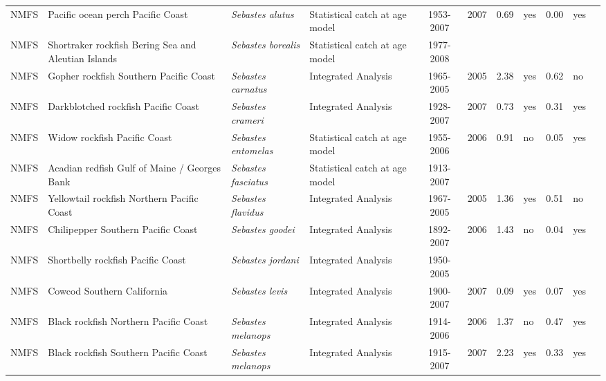 \begin{longtable}{p{1.8cm}p{3.5cm}p{3.5cm}p{3cm}cccp{0.9cm}cp{0.9cm}c}
  NMFS & Pacific ocean perch Pacific Coast & \textit{Sebastes alutus} & Statistical catch at age model & 1953-2007 & 2007 & 0.69 & yes & 0.00 & yes & \cite{NWFSC-POPERCHPCOAST-2007-Pacific ocean perch.pdf} \\ 
  NMFS & Shortraker rockfish Bering Sea and Aleutian Islands & \textit{Sebastes borealis} & Statistical catch at age model & 1977-2008 &  &  &  &  &  & \cite{2008_SAFE_BSAIshortraker.pdf} \\ 
  NMFS & Gopher rockfish Southern Pacific Coast & \textit{Sebastes carnatus} & Integrated Analysis & 1965-2005 & 2005 & 2.38 & yes & 0.62 & no & \cite{2005-SAFE-Wcgopher.pdf} \\ 
  NMFS & Darkblotched rockfish Pacific Coast & \textit{Sebastes crameri} & Integrated Analysis & 1928-2007 & 2007 & 0.73 & yes & 0.31 & yes & \cite{NWFSC-DKROCKPCOAST-2008-Darkblotched rockfish.pdf} \\ 
  NMFS & Widow rockfish Pacific Coast & \textit{Sebastes entomelas} & Statistical catch at age model & 1955-2006 & 2006 & 0.91 & no & 0.05 & yes & \cite{NWFSC-WROCKPCOAST-2007-widow.pdf} \\ 
  NMFS & Acadian redfish Gulf of Maine / Georges Bank & \textit{Sebastes fasciatus} & Statistical catch at age model & 1913-2007 &  &  &  &  &  & \cite{AcadianRedfish2008.pdf} \\ 
  NMFS & Yellowtail rockfish Northern Pacific Coast & \textit{Sebastes flavidus} & Integrated Analysis & 1967-2005 & 2005 & 1.36 & yes & 0.51 & no & \cite{2005_SAFE_yellowtail.pdf} \\ 
  NMFS & Chilipepper Southern Pacific Coast & \textit{Sebastes goodei} & Integrated Analysis & 1892-2007 & 2006 & 1.43 & no & 0.04 & yes & \cite{NWFSC-CHILISPCOAST-2007-Chilipepper CA OR.pdf} \\ 
  NMFS & Shortbelly rockfish Pacific Coast & \textit{Sebastes jordani} & Integrated Analysis & 1950-2005 &  &  &  &  &  & \cite{SWFSC-SBELLYROCKPCOAST-2007-Shortbelly rockfish.pdf} \\ 
  NMFS & Cowcod Southern California & \textit{Sebastes levis} & Integrated Analysis & 1900-2007 & 2007 & 0.09 & yes & 0.07 & yes & \cite{NWFSC-COWCODSCAL-2007-Cowcod CA.pdf} \\ 
  NMFS & Black rockfish Northern Pacific Coast & \textit{Sebastes melanops} & Integrated Analysis & 1914-2006 & 2006 & 1.37 & no & 0.47 & yes & \cite{NWFSC-BLACKROCKNPCOAST-2007-Black rockfish NOR WA.pdf} \\ 
  NMFS & Black rockfish Southern Pacific Coast & \textit{Sebastes melanops} & Integrated Analysis & 1915-2007 & 2007 & 2.23 & yes & 0.33 & yes & \cite{NWFSC-BLACKROCKSPCOAST-2007-Black rockfish OR CA.pdf} \\ 

\end{longtable}
